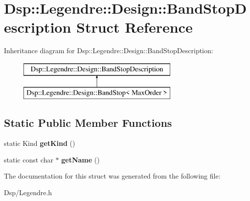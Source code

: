 \hypertarget{structDsp_1_1Legendre_1_1Design_1_1BandStopDescription}{\section{Dsp\-:\-:Legendre\-:\-:Design\-:\-:Band\-Stop\-Description Struct Reference}
\label{structDsp_1_1Legendre_1_1Design_1_1BandStopDescription}
}
Inheritance diagram for Dsp\-:\-:Legendre\-:\-:Design\-:\-:Band\-Stop\-Description\-:\begin{figure}[H]
\begin{center}
\leavevmode
\includegraphics[height=2.000000cm]{structDsp_1_1Legendre_1_1Design_1_1BandStopDescription}
\end{center}
\end{figure}
\subsection*{Static Public Member Functions}
\begin{DoxyCompactItemize}
\item 
\hypertarget{structDsp_1_1Legendre_1_1Design_1_1BandStopDescription_ae976a1d8eb8b0679773dd78ff627bf80}{static Kind {\bfseries get\-Kind} ()}\label{structDsp_1_1Legendre_1_1Design_1_1BandStopDescription_ae976a1d8eb8b0679773dd78ff627bf80}

\item 
\hypertarget{structDsp_1_1Legendre_1_1Design_1_1BandStopDescription_ae889a56713adb3ccad09db063d2dd9a6}{static const char $\ast$ {\bfseries get\-Name} ()}\label{structDsp_1_1Legendre_1_1Design_1_1BandStopDescription_ae889a56713adb3ccad09db063d2dd9a6}

\end{DoxyCompactItemize}


The documentation for this struct was generated from the following file\-:\begin{DoxyCompactItemize}
\item 
Dsp/Legendre.\-h\end{DoxyCompactItemize}
